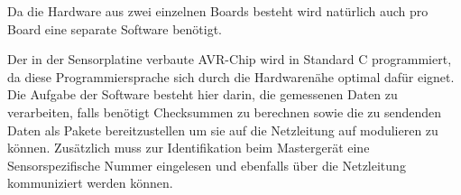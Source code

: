 %

Da die  Hardware aus zwei einzelnen  Boards besteht wird nat\"urlich  auch pro
Board eine separate Software ben\"otigt.

Der in  der Sensorplatine verbaute  AVR-Chip wird in Standard  C programmiert,
da  diese Programmiersprache  sich  durch die  Hardwaren\"ahe optimal  daf\"ur
eignet. Die Aufgabe der  Software besteht hier darin, die  gemessenen Daten zu
verarbeiten, falls ben\"otigt Checksummen zu  berechnen sowie die zu sendenden
Daten als  Pakete bereitzustellen  um sie auf  die Netzleitung  auf modulieren
zu  k\"onnen. Zus\"atzlich muss  zur  Identifikation  beim Masterger\"at  eine
Sensorspezifische  Nummer  eingelesen  und ebenfalls  \"uber  die  Netzleitung
kommuniziert werden k\"onnen.

